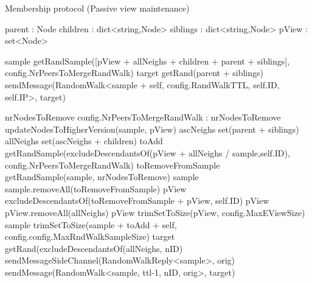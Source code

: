 \begin{algorithm}
\label{alg:memb:passive_view_maint}
\caption{Membership protocol (Passive view maintenance)}
\begin{algorithmic}[1]
    
    \asdstate
        \State parent : Node  
        \State children : dict<string,Node>  
        \State siblings : dict<string,Node>  
        \State pView : set<Node> \label{alg:memb:passive_view_maint:state}
    \asdend

     \label{alg:memb:passive_view_maint:walk_trig}
        \State sample \asdassign getRandSample([pView + allNeighs + children + parent + siblings], config.NrPeersToMergeRandWalk)
        \State target \asdassign getRand(parent + siblings)
        \State sendMessage(RandomWalk<sample + self, config.RandWalkTTL, self.ID, self.IP>, target)
    \asdend

     \label{alg:memb:passive_view_maint:walk_rec}
        \State nrNodesToRemove \asdassign config.NrPeersToMergeRandWalk
        :
            \State nrNodesToRemove 
        \EndIf
        \State updateNodesToHigherVersion(sample, pView) \label{alg:memb:passive_view_maint:walk_rec_merge_start}
        \State ascNeighs \asdassign set(parent + siblings)
        \State allNeighs \asdassign set(ascNeighs + children)
        \State toAdd \asdassign getRandSample(excludeDescendantsOf(pView + allNeighs / sample,self.ID), config.NrPeersToMergeRandWalk)
        \State toRemoveFromSample \asdassign getRandSample(sample, nrNodesToRemove)
        \State sample \asdassign sample.removeAll(toRemoveFromSample)
        \State pView \asdassign excludeDescendantsOf(toRemoveFromSample + pView, self.ID)  
        \State pView \asdassign pView.removeAll(allNeighs)
        \State pView \asdassign trimSetToSize(pView, config.MaxEViewSize)
        \State sample  \asdassign trimSetToSize(sample + toAdd + self, config.config.MaxRndWalkSampleSize) \label{alg:memb:passive_view_maint:walk_rec_merge_end}
        \State target \asdassign getRand(excludeDescendantsOf(allNeighs, nID)
         \label{alg:memb:passive_view_maint:walk_rec_send}
            \State sendMessageSideChannel(RandomWalkReply<sample>, orig)
        \Else
            \State sendMessage(RandomWalk<sample, ttl-1, nID, orig>, target)
        \EndIf \label{alg:memb:passive_view_maint:walk_rec_send_end}
    \asdend


\end{algorithmic}
\end{algorithm}
